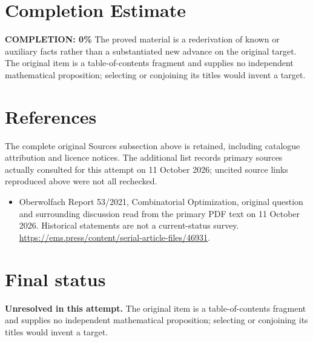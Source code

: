 \documentclass[11pt]{article}
\begin{document}
\section{Completion Estimate}
\noindent\textbf{COMPLETION: 0\%}
The proved material is a rederivation of known or auxiliary facts rather than a substantiated new advance on the original target. The original item is a table-of-contents fragment and supplies no independent mathematical proposition; selecting or conjoining its titles would invent a target.
\section{References}
The complete original Sources subsection above is retained, including catalogue attribution and licence notices. The additional list records primary sources actually consulted for this attempt on 11 October 2026; uncited source links reproduced above were not all rechecked.
\begin{itemize}
\item Oberwolfach Report 53/2021, Combinatorial Optimization, original question and surrounding discussion read from the primary PDF text on 11 October 2026. Historical statements are not a current-status survey. \url{https://ems.press/content/serial-article-files/46931}.
\end{itemize}
\section{Final status}
\textbf{Unresolved in this attempt.} The original item is a table-of-contents fragment and supplies no independent mathematical proposition; selecting or conjoining its titles would invent a target.
\end{document}

